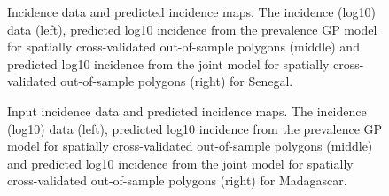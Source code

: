 \documentclass{statsoc}
\begin{document}
\begin{figure}
\caption{\label{predobsmapsen}
Incidence data and predicted incidence maps.
The incidence (log10) data (left), predicted log10 incidence from the prevalence GP model for spatially cross-validated out-of-sample polygons (middle) and predicted log10 incidence from the joint model for spatially cross-validated out-of-sample polygons (right) for Senegal.
}

\end{figure}



\begin{figure}
\caption{\label{predobsmapmdg}Input incidence data and predicted incidence maps.
The incidence (log10) data (left), predicted log10 incidence from the prevalence GP model for spatially cross-validated out-of-sample polygons (middle) and predicted log10 incidence from the joint model for spatially cross-validated out-of-sample polygons (right) for Madagascar.
}

\end{figure}
\end{document}
